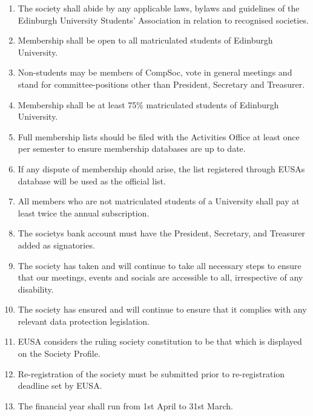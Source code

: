\begin{enumerate}
  \item The society shall abide by any applicable laws, bylaws and guidelines of the Edinburgh University Students’ Association in relation to recognised societies.

  \item Membership shall be open to all matriculated students of Edinburgh University.

  \item Non-students may be members of CompSoc, vote in general meetings and stand for committee-positions other than President, Secretary and Treasurer.

  \item Membership shall be at least 75\% matriculated students of Edinburgh University.

  \item Full membership lists should be filed with the Activities Office at least once per semester to ensure membership databases are up to date.

  \item If any dispute of membership should arise, the list registered through EUSA\textquotesingle s database will be used as the official list.

  \item All members who are not matriculated students of a University shall pay at least twice the annual subscription.

  \item The society\textquotesingle s bank account must have the President, Secretary, and Treasurer added as signatories.

  \item The society has taken and will continue to take all necessary steps to ensure that our meetings, events and socials are accessible to all, irrespective of any disability.

  \item The society has ensured and will continue to ensure that it complies with any relevant data protection legislation.

  \item EUSA considers the ruling society constitution to be that which is displayed on the Society Profile.

  \item Re-registration of the society must be submitted prior to re-registration deadline set by EUSA.

  \item The financial year shall run from 1st April to 31st March.


\end{enumerate}
